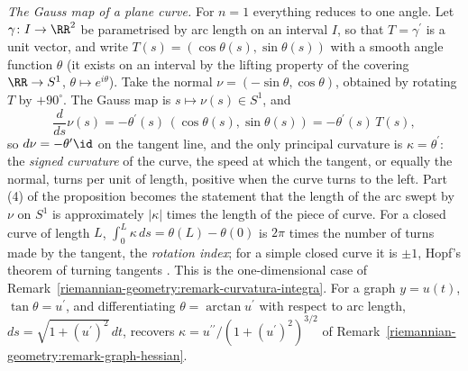\begin{remark}\label{riemannian-geometry:remark-gauss-map-curves}
\emph{The Gauss map of a plane curve.} For $n = 1$ everything reduces to one angle. Let $\gamma \colon I \to \RR^2$ be parametrised by arc length on an interval $I$, so that $T = \gamma^{\prime}$ is a unit
vector, and write $T(s) = (\cos\theta(s), \sin\theta(s))$ with a smooth angle function $\theta$ (it exists on an interval by the lifting property of the covering $\RR \to S^1$, $\theta \mapsto e^{i\theta}$). Take
the normal $\nu = (-\sin\theta, \cos\theta)$, obtained by rotating $T$ by $+90^\circ$. The Gauss map is $s \mapsto \nu(s) \in S^1$, and
\[
\frac{d}{ds}\nu(s) = -\theta^{\prime}(s)\,(\cos\theta(s), \sin\theta(s)) = -\theta^{\prime}(s)\,T(s),
\]
so $d\nu = -\theta^{\prime}\id$ on the tangent line, and the only principal curvature is $\kappa = \theta^{\prime}$: the \emph{signed curvature} of the curve, the speed at which the tangent, or equally the normal,
turns per unit of length, positive when the curve turns to the left. Part (4) of the proposition becomes the statement that the length of the arc swept by $\nu$ on $S^1$ is approximately $|\kappa|$ times the
length of the piece of curve. For a closed curve of length $L$, $\int_0^L\kappa\,ds = \theta(L) - \theta(0)$ is $2\pi$ times the number of turns made by the tangent, the \emph{rotation index}; for a simple
closed curve it is $\pm1$, Hopf's theorem of turning tangents \cite{do-carmo-curves-surfaces}. This is the one-dimensional case of Remark~\ref{riemannian-geometry:remark-curvatura-integra}. For a graph $y = u(t)$,
$\tan\theta = u^{\prime}$, and differentiating $\theta = \arctan u^{\prime}$ with respect to arc length, $ds = \sqrt{1 + (u^{\prime})^2}\,dt$, recovers $\kappa = u^{\prime\prime}/(1 + (u^{\prime})^2)^{3/2}$ of
Remark~\ref{riemannian-geometry:remark-graph-hessian}.
\end{remark}


